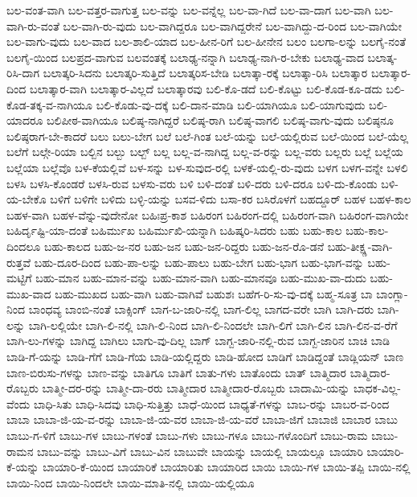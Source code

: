 {ಬಲ-ವಂತ-ವಾಗಿ
ಬಲ-ವತ್ತರ-ವಾಗುತ್ತ
ಬಲ-ವನ್ನು
ಬಲ-ವನ್ನೆಲ್ಲ
ಬಲ-ವಾ-ಗಿದೆ
ಬಲ-ವಾ-ದಾಗ
ಬಲ-ವಾಗಿ
ಬಲ-ವಾಗಿ-ರು-ವಂತೆ
ಬಲ-ವಾಗಿ-ರು-ವುದು
ಬಲ-ವಾಗಿದ್ದರೂ
ಬಲ-ವಾಗಿದ್ದರೇನೆ
ಬಲ-ವಾಗಿದ್ದು-ದ-ರಿಂದ
ಬಲ-ವಾಗಿಯೇ
ಬಲ-ವಾಗು-ವುದು
ಬಲ-ವಾದ
ಬಲ-ಶಾಲಿ-ಯಾದ
ಬಲ-ಹೀನ-ರಿಗೆ
ಬಲ-ಹೀನೇನ
ಬಲಂ
ಬಲಗಾ-ಲನ್ನು
ಬಲಗೈ-ನಂತೆ
ಬಲಗೈ-ಯಿಂದ
ಬಲಪ್ರದ-ವಾಗುವ
ಬಲವಂತಕ್ಕೆ
ಬಲಾಢ್ಯ-ನನ್ನಾಗಿ
ಬಲಾಢ್ಯ-ನಾಗಿ-ರ-ಬೇಕು
ಬಲಾಢ್ಯ-ವಾದ
ಬಲಾತ್ಕ-ರಿಸಿ-ದಾಗ
ಬಲಾತ್ಕರಿ-ಸಿದನು
ಬಲಾತ್ಕರಿ-ಸುತ್ತಿದೆ
ಬಲಾತ್ಕರಿಸ-ಬೇಡಿ
ಬಲಾತ್ಕಾ-ರಕ್ಕೆ
ಬಲಾತ್ಕಾ-ರಿಸಿ
ಬಲಾತ್ಕಾರ
ಬಲಾತ್ಕಾರ-ದಿಂದ
ಬಲಾತ್ಕಾರ-ವಾಗಿ
ಬಲಾತ್ಕಾರ-ವಿಲ್ಲದೆ
ಬಲಾತ್ಕಾರವು
ಬಲಿ-ಕೊ-ಡದೆ
ಬಲಿ-ಕೊಟ್ಟು
ಬಲಿ-ಕೊಡ-ಕೂ-ಡದು
ಬಲಿ-ಕೊಡ-ತಕ್ಕ-ವ-ನಾಗಿಯೂ
ಬಲಿ-ಕೊಡು-ವು-ದಕ್ಕೆ
ಬಲಿ-ದಾನ-ಮಾಡಿ
ಬಲಿ-ಯಾಗಿಯೂ
ಬಲಿ-ಯಾಗುವುದು
ಬಲಿ-ಯಾದರೂ
ಬಲಿಪೀಠ-ವಾಗಿಯೂ
ಬಲಿಷ್ಠ-ನಾಗಿದ್ದರೆ
ಬಲಿಷ್ಠ-ರಾಗಿ
ಬಲಿಷ್ಠ-ವಾಗಲಿ
ಬಲಿಷ್ಠ-ವಾಗು-ವುದು
ಬಲಿಷ್ಠನೂ
ಬಲಿಷ್ಠರಾಗ-ಬೇ-ಕಾದರೆ
ಬಲು
ಬಲು-ಬೇಗ
ಬಲೆ
ಬಲೆ-ಗಿಂತ
ಬಲೆ-ಯನ್ನು
ಬಲೆ-ಯಲ್ಲಿರುವ
ಬಲೆ-ಯಿಂದ
ಬಲೆ-ಯೆಲ್ಲ
ಬಲೆಗೆ
ಬಲ್ಗೇ-ರಿಯಾ
ಬಲ್ಬಿನ
ಬಲ್ಬು
ಬಲ್ಬ್
ಬಲ್ಲ
ಬಲ್ಲ-ವ-ನಾಗಿದ್ದ
ಬಲ್ಲ-ವ-ರನ್ನು
ಬಲ್ಲ-ವರು
ಬಲ್ಲರು
ಬಲ್ಲೆ
ಬಲ್ಲೆಯ
ಬಲ್ಲೆಯಾ
ಬಲ್ಲೆವೊ
ಬಳ-ಕೆಯಲ್ಲಿವೆ
ಬಳ-ಸನ್ನು
ಬಳ-ಸುವುದ-ರಲ್ಲಿ
ಬಳಕೆ-ಯಲ್ಲಿ-ರು-ವುದು
ಬಳಗ
ಬಳಗ-ವನ್ನೇ
ಬಳಲಿ
ಬಳಸಿ
ಬಳಸಿ-ಕೊಂಡರೆ
ಬಳಸಿ-ರುವ
ಬಳಸು-ವರು
ಬಳಿ
ಬಳಿ-ದಂತೆ
ಬಳಿ-ದರು
ಬಳಿ-ದರೂ
ಬಳಿ-ದು-ಕೊಂಡು
ಬಳಿ-ಯ-ಬೇಕೊ
ಬಳಿಗೆ
ಬಳಿಗೇ
ಬಳಿದು
ಬಳ್ಳಿ-ಯನ್ನು
ಬಸವ-ಳಿದು
ಬಸಾ-ಕರ
ಬಸಿರೊಳಗೆ
ಬಹದ್ದೂರ್
ಬಹಳ
ಬಹಳ-ಕಾಲ
ಬಹಳ-ವಾಗಿ
ಬಹಳ-ವೆನ್ನು-ವುದೇನೋ
ಬಹಿಃಪ್ರ-ಕಾಶ
ಬಹಿರಂಗ
ಬಹಿರಂಗ-ದಲ್ಲಿ
ಬಹಿರಂಗ-ವಾಗಿ
ಬಹಿರಂಗ-ವಾಗಿಯೇ
ಬಹಿರ್ದೃಷ್ಟಿ-ಯಾ-ದಂತೆ
ಬಹಿರ್ಮುಖ
ಬಹಿರ್ಮುಖಿ-ಯನ್ನಾಗಿ
ಬಹಿಷ್ಕರಿ-ಸಿದರು
ಬಹು
ಬಹು-ಕಾಲ
ಬಹು-ಕಾಲ-ದಿಂದಲೂ
ಬಹು-ಕಾಲದ
ಬಹು-ಜ-ನರ
ಬಹು-ಜನ
ಬಹು-ಜನ-ರಿದ್ದರು
ಬಹು-ಜನ-ರೊ-ಡನೆ
ಬಹು-ತೀಕ್ಷ್ಣ-ವಾಗಿ-ರುತ್ತವೆ
ಬಹು-ದೂರ-ದಿಂದ
ಬಹು-ಪಾ-ಲನ್ನು
ಬಹು-ಪಾಲು
ಬಹು-ಬೇಗ
ಬಹು-ಭಾಗ
ಬಹು-ಭಾಗ-ವನ್ನು
ಬಹು-ಮಟ್ಟಿಗೆ
ಬಹು-ಮಾನ
ಬಹು-ಮಾನ-ವನ್ನು
ಬಹು-ಮಾನ-ವಾಗಿ
ಬಹು-ಮಾನವೂ
ಬಹು-ಮುಖ-ವಾ-ದುದು
ಬಹು-ಮುಖ-ವಾದ
ಬಹು-ಮುಖದ
ಬಹು-ವಾಗಿ
ಬಹು-ವಾಗಿವೆ
ಬಹುಶಃ
ಬಹೆಗ-ರಿ-ಸು-ವು-ದಕ್ಕೆ
ಬಹ್ಮ-ಸೂತ್ರ
ಬಾ
ಬಾಂಗ್ಲಾ-ನಿಂದ
ಬಾಂಧವ್ಯ
ಬಾಂಬಿ-ನಂತೆ
ಬಾಕ್ಸಿಂಗ್
ಬಾಗ-ಬ-ಜಾರಿ-ನಲ್ಲಿ
ಬಾಗ-ಲಿಲ್ಲ
ಬಾಗದ-ವರೇ
ಬಾಗಿ
ಬಾಗಿ-ದರು
ಬಾಗಿ-ಲನ್ನು
ಬಾಗಿ-ಲಲ್ಲಿಯೇ
ಬಾಗಿ-ಲಿ-ನಲ್ಲಿ
ಬಾಗಿ-ಲಿ-ನಿಂದ
ಬಾಗಿ-ಲಿ-ನಿಂದಲೇ
ಬಾಗಿ-ಲಿಗೆ
ಬಾಗಿ-ಲಿನ
ಬಾಗಿ-ಲಿನ-ವ-ರೆಗೆ
ಬಾಗಿ-ಲು-ಗಳನ್ನು
ಬಾಗಿದ್ದ
ಬಾಗಿಲು
ಬಾಗು-ವು-ದಿಲ್ಲ
ಬಾಗ್
ಬಾಗ್ಬ-ಜಾರಿ-ನಲ್ಲಿ-ರುವ
ಬಾಗ್ಬ-ಜಾರಿನ
ಬಾಚಿ
ಬಾಡಿ
ಬಾಡಿ-ಗೆ-ಯನ್ನು
ಬಾಡಿ-ಗೆಗೆ
ಬಾಡಿ-ಗೆಯ
ಬಾಡಿ-ಯಲ್ಲಿದ್ದರು
ಬಾಡಿ-ಹೋದ
ಬಾಡಿಗೆ
ಬಾಡಿದ್ದಂತೆ
ಬಾಡ್ಲಿಯನ್
ಬಾಣ
ಬಾಣ-ಬಿರುಸು-ಗಳನ್ನು
ಬಾಣ-ವನ್ನು
ಬಾತಿಗೂ
ಬಾತಿಗೆ
ಬಾತು-ಗಳು
ಬಾತೊಂದು
ಬಾತ್
ಬಾತ್ಮಿದಾರ
ಬಾತ್ಮಿದಾರ-ರೊಬ್ಬರು
ಬಾತ್ಮೀ-ದರ-ರನ್ನು
ಬಾತ್ಮೀ-ದಾ-ರರು
ಬಾತ್ಮೀದಾರ
ಬಾತ್ಮೀದಾರ-ರೊಬ್ಬರು
ಬಾದಾಮಿ-ಯನ್ನು
ಬಾಧಕ-ವಿಲ್ಲ-ವೆಂದು
ಬಾಧಿ-ಸಿತು
ಬಾಧಿ-ಸಿದವು
ಬಾಧಿ-ಸುತ್ತಿತ್ತು
ಬಾಧೆ-ಯಿಂದ
ಬಾಧ್ಯತೆ-ಗಳನ್ನು
ಬಾಬ-ರನ್ನು
ಬಾಬರ-ವ-ರಿಂದ
ಬಾಬಾ
ಬಾಬಾ-ಜಿ-ಯ-ವ-ರನ್ನು
ಬಾಬಾ-ಜಿ-ಯ-ವರ
ಬಾಬಾ-ಜಿ-ಯ-ವರೆ
ಬಾಬಾ-ಜಿಗೆ
ಬಾಬಾಜಿ
ಬಾಬಾರ
ಬಾಬು
ಬಾಬು-ಗ-ಳಿಗೆ
ಬಾಬು-ಗಳ
ಬಾಬು-ಗಳಂತೆ
ಬಾಬು-ಗಳು
ಬಾಬು-ಗಳೂ
ಬಾಬು-ಗಳೊಂದಿಗೆ
ಬಾಬು-ರಾಮ
ಬಾಬು-ರಾಮನ
ಬಾಬು-ವನ್ನು
ಬಾಬು-ವಿಗೆ
ಬಾಬು-ವಿನ
ಬಾಬುವೇ
ಬಾಯನ್ನು
ಬಾಯಲ್ಲಿ
ಬಾಯಲ್ಲೂ
ಬಾಯಾರಿ
ಬಾಯಾರಿ-ಕೆ-ಯನ್ನು
ಬಾಯಾರಿ-ಕೆ-ಯಿಂದ
ಬಾಯಾರಿಕೆ
ಬಾಯಾರಿತು
ಬಾಯಾರಿದ
ಬಾಯಿ
ಬಾಯಿ-ಗಳ
ಬಾಯಿ-ತಪ್ಪಿ
ಬಾಯಿ-ನಲ್ಲಿ
ಬಾಯಿ-ನಿಂದ
ಬಾಯಿ-ನಿಂದಲೇ
ಬಾಯಿ-ಮಾತಿ-ನಲ್ಲಿ
ಬಾಯಿ-ಯಲ್ಲಿಯೂ
}
